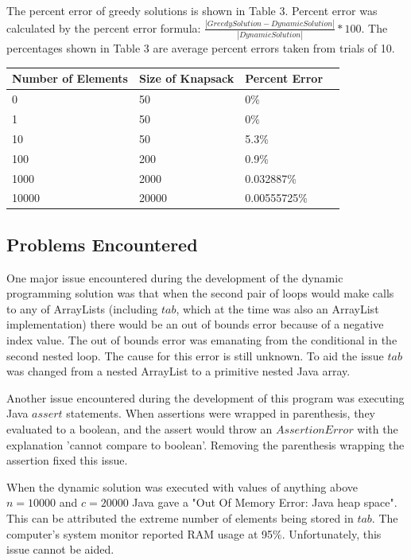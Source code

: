 \documentclass[onecolumn, 12pt, article]{IEEEtran}
\numberwithin{case}{problem}
\numberwithin{condition}{problem}
\numberwithin{condition}{subsection}
\numberwithin{definition}{section}
\theoremstyle{remark}
\numberwithin{question}{problem}
\theoremstyle{plain}
\numberwithin{answer}{problem}
\numberwithin{solution}{section}
\numberwithin{equation}{section}%
\begin{document}
The percent error of greedy solutions is shown in Table 3. Percent error was calculated by the percent error formula: $\frac{ | Greedy Solution - Dynamic Solution | }{ | Dynamic Solution | } * 100$. The percentages shown in Table 3 are average percent errors taken from trials of 10.
\begin{center}
\begin{tabular}{|l|l|l|l}
\hline Number of Elements & Size of Knapsack & Percent Error \\
\hline 0 & 50 & 0\% \\
\hline 1 & 50 & 0\% \\
\hline 10 & 50 & 5.3\% \\
\hline 100 & 200 & 0.9\% \\
\hline 1000 & 2000 & 0.032887\% \\
\hline 10000 & 20000 & 0.00555725\% \\
\hline
\end{tabular}
\end{center}

\subsection{Problems Encountered}
One major issue encountered during the development of the dynamic programming solution was that when the second pair of loops would make calls to any of ArrayLists (including $tab$, which at the time was also an ArrayList implementation) there would be an out of bounds error because of a negative index value. The out of bounds error was emanating from the conditional in the second nested loop. The cause for this error is still unknown. To aid the issue $tab$ was changed from a nested ArrayList to a primitive nested Java array. 

Another issue encountered during the development of this program was executing Java $assert$ statements. When assertions were wrapped in parenthesis, they evaluated to a boolean, and the assert would throw an $AssertionError$ with the explanation 'cannot compare to boolean'. Removing the parenthesis wrapping the assertion fixed this issue.

When the dynamic solution was executed with values of anything above $n = 10000$ and $c = 20000$ Java gave a "Out Of Memory Error: Java heap space". This can be attributed the extreme number of elements being stored in $tab$. The computer's system monitor reported RAM usage at 95\%. Unfortunately, this issue cannot be aided. 
\end{document}
